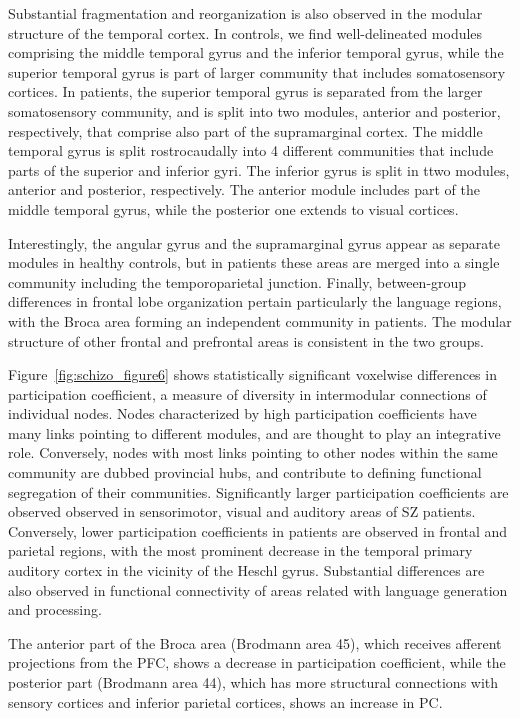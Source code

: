 Substantial fragmentation and reorganization is also observed in the modular structure of the temporal cortex.
In controls, we find well-delineated modules comprising the middle temporal gyrus and the inferior temporal gyrus, while the superior temporal gyrus is part of larger community that includes somatosensory cortices.
In patients, the superior temporal gyrus is separated from the larger somatosensory community, and is split into two modules, anterior and posterior, respectively, that comprise also part of the supramarginal cortex.
The middle temporal gyrus is split rostrocaudally into 4 different communities that include parts of the superior and inferior gyri.
The inferior gyrus is split in ttwo modules, anterior and posterior, respectively.
The anterior module includes part of the middle temporal gyrus, while the posterior one extends to visual cortices. 

Interestingly, the angular gyrus and the supramarginal gyrus appear as separate modules in healthy controls, but in patients these areas are merged into a single community including the temporoparietal junction. 
Finally, between-group differences in frontal lobe organization pertain particularly the language regions, with the Broca area forming an independent community in patients.
The modular structure of other frontal and prefrontal areas is consistent in the two groups.

Figure~\ref{fig:schizo_figure6} shows statistically significant voxelwise differences in participation coefficient, a measure of diversity in intermodular connections of individual nodes.
Nodes characterized by high participation coefficients have many links pointing to different modules, and are thought to play an integrative role. 
Conversely, nodes with most links pointing to other nodes within the same community are dubbed provincial hubs, and contribute to defining functional segregation of their communities.
Significantly larger participation coefficients are observed observed in sensorimotor, visual and auditory areas of SZ patients.
Conversely, lower participation coefficients in patients are observed in frontal and parietal regions, with the most prominent decrease in the temporal primary auditory cortex in the vicinity of the Heschl gyrus.
Substantial differences are also observed in functional connectivity of areas related with language generation and processing.

The anterior part of the Broca area (Brodmann area 45), which receives afferent projections from the PFC, shows a decrease in participation coefficient, while the posterior part (Brodmann area 44), which has more structural connections with sensory cortices and inferior parietal cortices, shows an increase in PC. 

